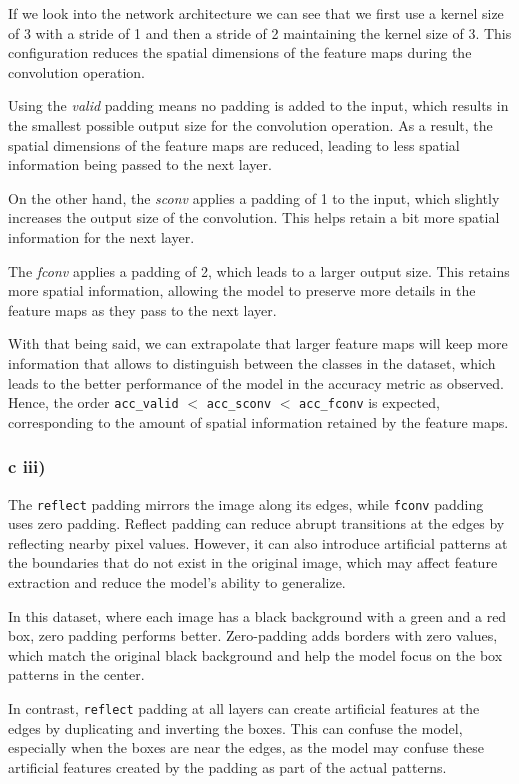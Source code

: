 \documentclass{article}
\begin{document}
If we look into the network architecture we can see that we first use a kernel size of 3 with a stride of 1 and then a stride of 2
maintaining the kernel size of 3. This configuration reduces the spatial dimensions of the feature maps during the convolution operation.

Using the \textit{valid} padding means no padding is added to the input, which results in the smallest possible output size for the convolution operation. As a result, the spatial dimensions of the feature maps are reduced, leading to less spatial information being passed to the next layer.

On the other hand, the \textit{sconv} applies a padding of 1 to the input, which slightly increases the output size of the convolution. This helps retain a bit more spatial information for the next layer.

The \textit{fconv} applies a padding of 2, which leads to a larger output size. This retains more spatial information, allowing the model to preserve more details in the feature maps as they pass to the next layer.

With that being said, we can extrapolate that larger feature maps will keep more information that allows to distinguish
between the classes in the dataset, which leads to the better performance of the model in the accuracy metric as observed. 
Hence, the order \texttt{acc\_valid} $<$ \texttt{acc\_sconv} $<$ \texttt{acc\_fconv} is expected, corresponding
to the amount of spatial information retained by the feature maps.

\subsubsection*{c iii)}

The \texttt{reflect} padding mirrors the image along its edges, while \texttt{fconv} padding uses zero padding. Reflect padding can reduce abrupt transitions at the edges by reflecting nearby pixel values. However, it can also introduce artificial patterns at the boundaries that do not exist in the original image, which may affect feature extraction and reduce the model’s ability to generalize.

In this dataset, where each image has a black background with a green and a red box, zero padding performs better. Zero-padding adds borders with zero values, which match the original black background and help the model focus on the box patterns in the center.

In contrast, \texttt{reflect} padding at all layers can create artificial features at the edges by duplicating and inverting the boxes. This can confuse the model, especially when the boxes are near the edges, as the model may confuse these artificial features created by the padding as part of the actual patterns.
\end{document}
